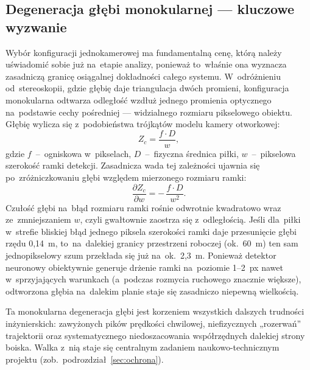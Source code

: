 \documentclass[14pt,a4paper]{extarticle}
\begin{document}
\subsection{Degeneracja głębi monokularnej — kluczowe wyzwanie}
\label{sec:degen}
Wybór konfiguracji jednokamerowej ma fundamentalną cenę, którą należy uświadomić sobie
już na~etapie analizy, ponieważ to~właśnie ona wyznacza zasadniczą granicę osiągalnej
dokładności całego systemu. W~odróżnieniu od~stereoskopii, gdzie głębię daje triangulacja
dwóch promieni, konfiguracja monokularna odtwarza odległość wzdłuż jednego promienia
optycznego na~podstawie cechy pośredniej — widzialnego rozmiaru pikselowego obiektu.
Głębię wylicza się z~podobieństwa trójkątów modelu kamery otworkowej:
\begin{equation}
Z_c = \frac{f \cdot D}{w},
\end{equation}
gdzie $f$~--~ogniskowa w~pikselach, $D$~--~fizyczna średnica piłki, $w$~--~pikselowa
szerokość ramki detekcji. Zasadnicza wada tej zależności ujawnia się po~zróżniczkowaniu
głębi względem mierzonego rozmiaru ramki:
\begin{equation}
\frac{\partial Z_c}{\partial w} = -\,\frac{f \cdot D}{w^{2}}.
\end{equation}
Czułość głębi na~błąd rozmiaru ramki rośnie odwrotnie kwadratowo wraz ze~zmniejszaniem
$w$, czyli gwałtownie zaostrza się z~odległością. Jeśli dla~piłki w~strefie bliskiej błąd
jednego piksela szerokości ramki daje przesunięcie głębi rzędu 0,14~m, to~na~dalekiej
granicy przestrzeni roboczej (ok.~60~m) ten sam jednopikselowy szum przekłada się już
na~ok.~2,3~m. Ponieważ detektor neuronowy obiektywnie generuje drżenie ramki na~poziomie
1--2~px nawet w~sprzyjających warunkach (a~podczas rozmycia ruchowego znacznie większe),
odtworzona głębia na~dalekim planie staje się zasadniczo niepewną wielkością.

Ta monokularna degeneracja głębi jest korzeniem wszystkich dalszych trudności
inżynierskich: zawyżonych pików prędkości chwilowej, niefizycznych „rozerwań” trajektorii
oraz systematycznego niedoszacowania współrzędnych dalekiej strony boiska. Walka z~nią
staje się centralnym zadaniem naukowo-technicznym projektu (zob.~podrozdział~\ref{sec:ochrona}).
\end{document}
